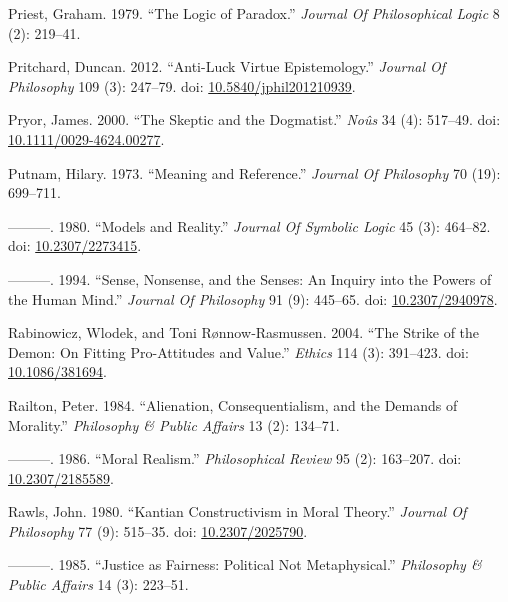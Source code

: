 \documentclass[
  10pt,
  letterpaper,
  DIV=11,
  numbers=noendperiod,
  twoside]{scrartcl}
\newlength{\cslhangindent}
\newenvironment{CSLReferences}[2] %
 {\begin{list}{}{%
  \setlength{\itemindent}{0pt}
  \setlength{\leftmargin}{0pt}
  \setlength{\parsep}{0pt}
  \ifodd #1
   \setlength{\leftmargin}{\cslhangindent}
   \setlength{\itemindent}{-1\cslhangindent}
  \fi
  \setlength{\itemsep}{#2\baselineskip}}}
 {\end{list}}
\begin{document}
\begin{CSLReferences}{1}{0}
Priest, Graham. 1979. {``The Logic of Paradox.''} \emph{Journal Of
Philosophical Logic} 8 (2): 219--41.

Pritchard, Duncan. 2012. {``Anti-Luck Virtue Epistemology.''}
\emph{Journal Of Philosophy} 109 (3): 247--79. doi:
\href{https://doi.org/10.5840/jphil201210939}{10.5840/jphil201210939}.

Pryor, James. 2000. {``The Skeptic and the Dogmatist.''} \emph{Noûs} 34
(4): 517--49. doi:
\href{https://doi.org/10.1111/0029-4624.00277}{10.1111/0029-4624.00277}.

Putnam, Hilary. 1973. {``Meaning and Reference.''} \emph{Journal Of
Philosophy} 70 (19): 699--711.

---------. 1980. {``Models and Reality.''} \emph{Journal Of Symbolic
Logic} 45 (3): 464--82. doi:
\href{https://doi.org/10.2307/2273415}{10.2307/2273415}.

---------. 1994. {``Sense, Nonsense, and the Senses: An Inquiry into the
Powers of the Human Mind.''} \emph{Journal Of Philosophy} 91 (9):
445--65. doi: \href{https://doi.org/10.2307/2940978}{10.2307/2940978}.

Rabinowicz, Wlodek, and Toni Rønnow‐Rasmussen. 2004. {``The Strike of
the Demon: On Fitting Pro-Attitudes and Value.''} \emph{Ethics} 114 (3):
391--423. doi: \href{https://doi.org/10.1086/381694}{10.1086/381694}.

Railton, Peter. 1984. {``Alienation, Consequentialism, and the Demands
of Morality.''} \emph{Philosophy \& Public Affairs} 13 (2): 134--71.

---------. 1986. {``Moral Realism.''} \emph{Philosophical Review} 95
(2): 163--207. doi:
\href{https://doi.org/10.2307/2185589}{10.2307/2185589}.

Rawls, John. 1980. {``Kantian Constructivism in Moral Theory.''}
\emph{Journal Of Philosophy} 77 (9): 515--35. doi:
\href{https://doi.org/10.2307/2025790}{10.2307/2025790}.

---------. 1985. {``Justice as Fairness: Political Not Metaphysical.''}
\emph{Philosophy \& Public Affairs} 14 (3): 223--51.


\end{CSLReferences}
\end{document}

